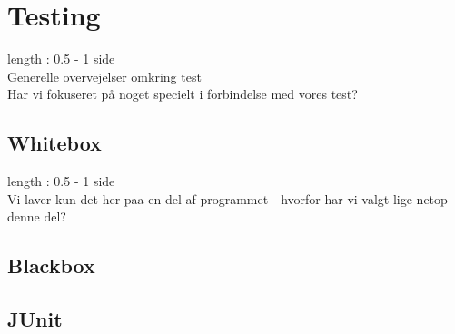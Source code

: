 \documentclass[a4paper,10pt,titlepage]{article}
\begin{document}
		
	\newpage
	\section{Testing}
		length : 0.5 - 1 side\\
		Generelle overvejelser omkring test\\
		Har vi fokuseret på noget specielt i forbindelse med vores test?\\
		
		\subsection{Whitebox}
			length : 0.5 - 1 side\\
			Vi laver kun det her paa en del af programmet - hvorfor har vi valgt lige netop denne del?\\
			
		\subsection{Blackbox}
			
		\subsection{JUnit}
			
\end{document}
